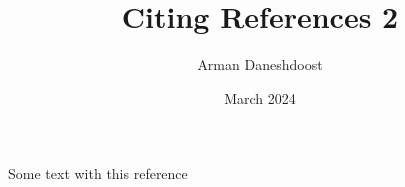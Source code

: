 \documentclass{article}
\title{Citing References 2}
\author{Arman Daneshdoost}
\date{March 2024}
\begin{document}
	\maketitle
	
	Some text with this reference 
	\cite{shelley}
	
	
\end{document}
